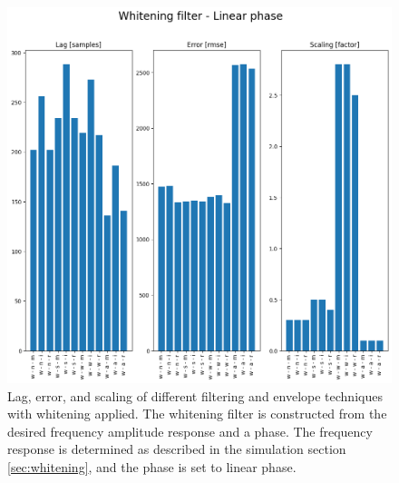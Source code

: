 \begin{figure}[h!t]
	\begin{center}
		\includegraphics[width=1.0\columnwidth]{images/result_whitening_linearphase.png}
	\end{center}
	\caption{Lag, error, and scaling of different filtering and envelope techniques with whitening applied. The whitening filter is constructed from the desired frequency amplitude response and a phase. The frequency response is determined as described in the simulation section \ref{sec:whitening}, and the phase is set to linear phase.}
	\label{fig:result_whitening_linearphase}
\end{figure}

